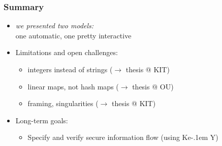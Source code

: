 \documentclass{beamer}
\newcommand{\KeY}{Ke\kern-.1em Y}
\begin{document}
\begin{frame}
  \frametitle{Summary}
  \begin{itemize} \itemsep3ex
  \item \emph{we presented two models:} \\
    one automatic, one pretty interactive
  \item Limitations and open challenges:
    \begin{itemize}
    \item integers instead of strings ($\to$ thesis @ KIT)
    \item linear maps, not hash maps ($\to$ thesis @ OU)
    \item framing, singularities ($\to$ thesis @ KIT)
    \end{itemize}
  \item Long-term goals:
    \begin{itemize}
    \item Specify and verify secure information flow (using \KeY)
    \end{itemize}
  \end{itemize}
\end{frame}
\end{document}
